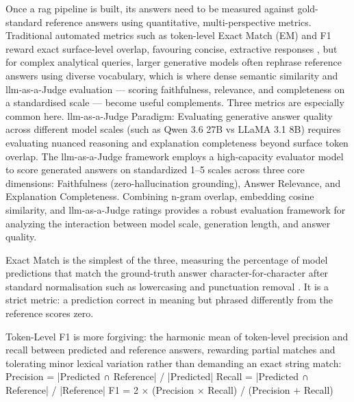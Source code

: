 Once a \gls{rag} pipeline is built, its answers need to be measured against gold-standard reference answers using quantitative, multi-perspective metrics. Traditional automated metrics such as token-level Exact Match (EM) and F1 reward exact surface-level overlap, favouring concise, extractive responses \citep{rajpurkar2018know}, but for complex analytical queries, larger generative models often rephrase reference answers using diverse vocabulary, which is where dense semantic similarity \citep{zhang2020bertscore} and \gls{llm}-as-a-Judge evaluation \citep{zheng2023judging} — scoring faithfulness, relevance, and completeness on a standardised scale — become useful complements. Three metrics are especially common here.
\newline \newline \gls{llm}-as-a-Judge Paradigm: Evaluating generative answer quality across different model scales (such as Qwen 3.6 27B vs LLaMA 3.1 8B) requires evaluating nuanced reasoning and explanation completeness beyond surface token overlap. The \gls{llm}-as-a-Judge framework \citep{zheng2023judging} employs a high-capacity evaluator model to score generated answers on standardized 1–5 scales across three core dimensions: Faithfulness (zero-hallucination grounding), Answer Relevance, and Explanation Completeness. Combining n-gram overlap, embedding cosine similarity, and \gls{llm}-as-a-Judge ratings provides a robust evaluation framework for analyzing the interaction between model scale, generation length, and answer quality.


Exact Match is the simplest of the three, measuring the percentage of model predictions that match the ground-truth answer character-for-character after standard normalisation such as lowercasing and punctuation removal \citep{rajpurkar2018know}. It is a strict metric: a prediction correct in meaning but phrased differently from the reference scores zero.


Token-Level F1 is more forgiving: the harmonic mean of token-level precision and recall between predicted and reference answers, rewarding partial matches and tolerating minor lexical variation rather than demanding an exact string match:
\newline \newline Precision = |Predicted ∩ Reference| / |Predicted|
\newline \newline Recall = |Predicted ∩ Reference| / |Reference|
\newline \newline F1 = 2 × (Precision × Recall) / (Precision + Recall)

